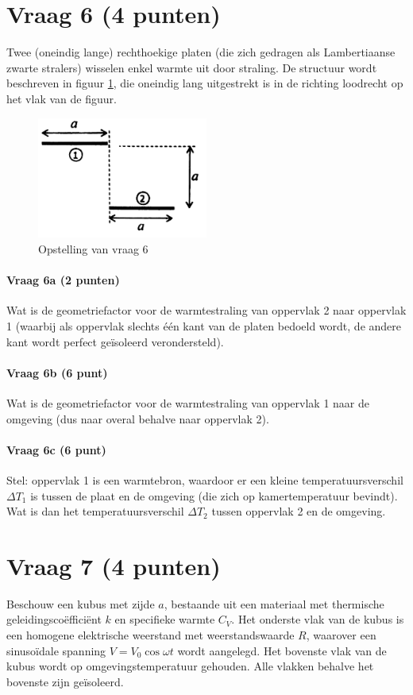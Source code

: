 \documentclass[a4paper]{article}
\begin{document}
\section*{Vraag 6 (4 punten)}
Twee (oneindig lange) rechthoekige platen (die zich gedragen als Lambertiaanse zwarte stralers) wisselen enkel warmte uit door straling. De structuur wordt beschreven in figuur \ref{fig:vraag6}, die oneindig lang uitgestrekt is in de richting loodrecht op het vlak van de figuur.

\begin{figure}[ht]
    \centering
    \includegraphics[width=0.5\textwidth]{vraag6}
    \caption{Opstelling van vraag 6}
    \label{fig:vraag6}
\end{figure}

\paragraph{Vraag 6a (2 punten)}
Wat is de geometriefactor voor de warmtestraling van oppervlak 2 naar oppervlak 1 (waarbij als oppervlak slechts één kant van de platen bedoeld wordt, de andere kant wordt perfect geïsoleerd verondersteld).

\paragraph{Vraag 6b (6 punt)}
Wat is de geometriefactor voor de warmtestraling van oppervlak 1 naar de omgeving (dus naar overal behalve naar oppervlak 2).

\paragraph{Vraag 6c (6 punt)}
Stel: oppervlak 1 is een warmtebron, waardoor er een kleine temperatuursverschil $\Delta T_1$ is tussen de plaat en de omgeving (die zich op kamertemperatuur bevindt). Wat is dan het temperatuursverschil $\Delta T_2$ tussen oppervlak 2 en de omgeving.

\section*{Vraag 7 (4 punten)}
Beschouw een kubus met zijde $a$, bestaande uit een materiaal met thermische geleidingscoëfficiënt $k$ en specifieke warmte $C_V$. Het onderste vlak van de kubus is een homogene elektrische weerstand met weerstandswaarde $R$, waarover een sinusoïdale spanning $V = V_0\cos{\omega t}$ wordt aangelegd. Het bovenste vlak van de kubus wordt op omgevingstemperatuur gehouden. Alle vlakken behalve het bovenste zijn geïsoleerd.
\end{document}
